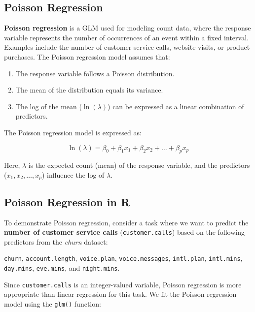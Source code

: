 \documentclass[
]{book}
\newcommand{\passthrough}[1]{#1}
\providecommand{\tightlist}{%
  \setlength{\itemsep}{0pt}\setlength{\parskip}{0pt}}
\theoremstyle{definition}
\theoremstyle{definition}
\theoremstyle{definition}
\theoremstyle{definition}
\theoremstyle{remark}
\begin{document}
\subsection{Poisson Regression}\label{poisson-regression}

\textbf{Poisson regression} is a GLM used for modeling count data, where the response variable represents the number of occurrences of an event within a fixed interval. Examples include the number of customer service calls, website visits, or product purchases. The Poisson regression model assumes that:

\begin{enumerate}
\def\labelenumi{\arabic{enumi}.}
\tightlist
\item
  The response variable follows a Poisson distribution.\\
\item
  The mean of the distribution equals its variance.\\
\item
  The log of the mean (\(\ln(\lambda)\)) can be expressed as a linear combination of predictors.
\end{enumerate}

The Poisson regression model is expressed as:

\[
\ln(\lambda) = \beta_0 + \beta_1 x_1 + \beta_2 x_2 + \dots + \beta_p x_p
\]

Here, \(\lambda\) is the expected count (mean) of the response variable, and the predictors (\(x_1, x_2, \dots, x_p\)) influence the log of \(\lambda\).

\subsection{Poisson Regression in R}\label{poisson-regression-in-r}

To demonstrate Poisson regression, consider a task where we want to predict the \textbf{number of customer service calls} (\passthrough{\lstinline!customer.calls!}) based on the following predictors from the \emph{churn} dataset:

\passthrough{\lstinline!churn!}, \passthrough{\lstinline!account.length!}, \passthrough{\lstinline!voice.plan!}, \passthrough{\lstinline!voice.messages!}, \passthrough{\lstinline!intl.plan!}, \passthrough{\lstinline!intl.mins!}, \passthrough{\lstinline!day.mins!}, \passthrough{\lstinline!eve.mins!}, and \passthrough{\lstinline!night.mins!}.

Since \passthrough{\lstinline!customer.calls!} is an integer-valued variable, Poisson regression is more appropriate than linear regression for this task. We fit the Poisson regression model using the \passthrough{\lstinline!glm()!} function:
\end{document}
